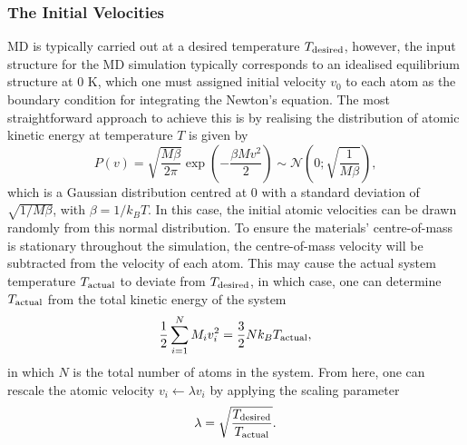 \subsubsection{The Initial Velocities}\label{sect:initial_velocity}
MD is typically carried out at a desired temperature $T_{\mbox{\scriptsize{desired}}}$, however, the input structure for the MD simulation typically corresponds to an idealised equilibrium structure at 0 K, which one must assigned initial velocity $v_0$ to each atom as the boundary condition for integrating the Newton's equation. The most straightforward approach to achieve this is by realising the distribution of atomic kinetic energy at temperature $T$ is given by
\begin{equation}
    \label{eq:particle_velocity_distribution}
    P(v)=\sqrt{\frac{M\beta}{2\pi}}\exp\left(-\frac{\beta Mv^2}{2}\right)\sim\mathcal{N}\left(0;\sqrt{\frac{1}{M\beta}}\right),
\end{equation}
which is a Gaussian distribution centred at 0 with a standard deviation of $\sqrt{1/M\beta}$, with $\beta=1/k_B T$. In this case, the initial atomic velocities can be drawn randomly from this normal distribution. To ensure the materials' centre-of-mass is stationary throughout the simulation, the centre-of-mass velocity will be subtracted from the velocity of each atom. This may cause the actual system temperature $T_{\mbox{\scriptsize{actual}}}$ to deviate from $T_{\mbox{\scriptsize{desired}}}$, in which case, one can determine $T_{\mbox{\scriptsize{actual}}}$ from the total kinetic energy of the system
\begin{equation*}
    \frac{1}{2}\sum_{i=1}^{N}M_i v_i^2 = \frac{3}{2}Nk_B T_{\mbox{\scriptsize{actual}}},
\end{equation*}
in which $N$ is the total number of atoms in the system. From here, one can rescale the atomic velocity $v_i\leftarrow\lambda v_i $ by applying the scaling parameter
\begin{equation*}
\lambda=\sqrt{\frac{T_{\mbox{\scriptsize{desired}}}}{T_{\mbox{\scriptsize{actual}}}}}.
\end{equation*}

